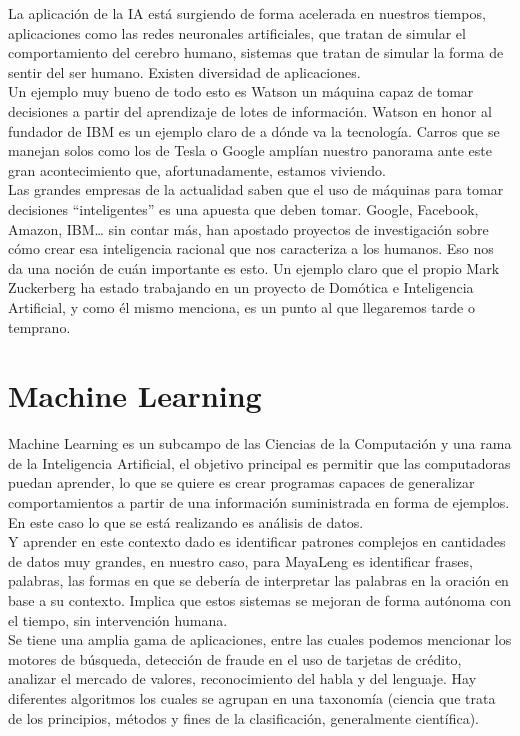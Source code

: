 \documentclass[a4paper,openright,11pt]{article}
\begin{document}
La aplicación de la IA está surgiendo de forma acelerada en nuestros tiempos, aplicaciones como las redes neuronales artificiales, que tratan de simular el comportamiento del cerebro humano, sistemas que tratan de simular la forma de sentir del ser humano. Existen diversidad de aplicaciones. \\

Un ejemplo muy bueno de todo esto es Watson un máquina capaz de tomar decisiones a partir del aprendizaje de lotes de información. Watson en honor al fundador de IBM es un ejemplo claro de a dónde va la tecnología. Carros que se manejan solos como los de Tesla o Google amplían nuestro panorama ante este gran acontecimiento que, afortunadamente, estamos viviendo. \\

Las grandes empresas de la actualidad saben que el uso de máquinas para tomar decisiones “inteligentes” es una apuesta que deben tomar. Google, Facebook, Amazon, IBM… sin contar más, han apostado proyectos de investigación sobre cómo crear esa inteligencia racional que nos caracteriza a los humanos. Eso nos da una noción de cuán importante es esto. Un ejemplo claro que el propio Mark Zuckerberg ha estado trabajando en un proyecto de Domótica e Inteligencia Artificial, y como él mismo menciona, es un punto al que llegaremos tarde o temprano.
\newpage

\section{Machine Learning}
Machine Learning es un subcampo de las Ciencias de la Computación y una rama de la Inteligencia Artificial, el objetivo principal es permitir que las computadoras puedan aprender, lo que se quiere es crear programas capaces de generalizar comportamientos a partir de una información suministrada en forma de ejemplos. En este caso lo que se está realizando es análisis de datos.\\

Y aprender en este contexto dado es identificar patrones complejos en cantidades de datos muy grandes, en nuestro caso, para MayaLeng es identificar frases, palabras, las formas en que se debería de interpretar las palabras en la oración en base a su contexto. Implica que estos sistemas se mejoran de forma autónoma con el tiempo, sin intervención humana.\\

Se tiene una amplia gama de aplicaciones, entre las cuales podemos mencionar los motores de búsqueda, detección de fraude en el uso de tarjetas de crédito, analizar el mercado de valores, reconocimiento del habla y del lenguaje. Hay diferentes algoritmos los cuales se agrupan en una taxonomía (ciencia que trata de los principios, métodos y fines de la clasificación, generalmente científica).
\end{document}
